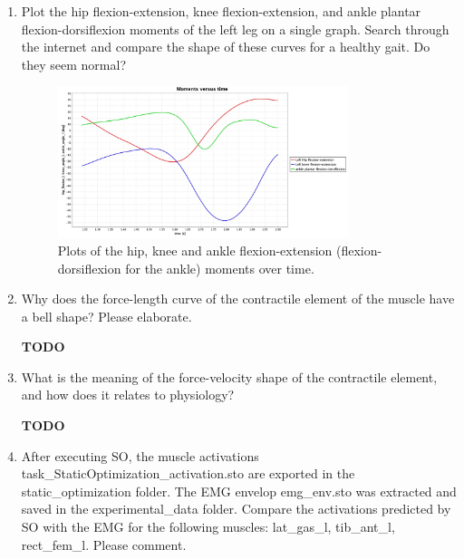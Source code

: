 \documentclass[11pt]{article}
\begin{document}
\begin{enumerate}
\begin{adjustwidth}{0.5cm}{}
    \end{adjustwidth}
    \item Plot the hip flexion-extension, knee flexion-extension, and ankle plantar flexion-dorsiflexion moments of the left leg on a single graph. Search through the internet and compare the shape of these curves for a healthy gait. Do they seem normal?
    \begin{adjustwidth}{0.5cm}{}
        \begin{figure}[h!]
            \centering
            \includegraphics[width=0.8\textwidth]{screens/moments_over_time.jpg}
            \caption{Plots of the hip, knee and ankle flexion-extension (flexion-dorsiflexion for the ankle) moments over time.}
        \end{figure}
    \end{adjustwidth}
    \item Why does the force-length curve of the contractile element of the muscle have a bell shape? Please elaborate. 
    \begin{adjustwidth}{0.5cm}{}
        \textbf{TODO}
    \end{adjustwidth}
    \item What is the meaning of the force-velocity shape of the contractile element, and how does it relates to physiology? 
    \begin{adjustwidth}{0.5cm}{}
        \textbf{TODO}
    \end{adjustwidth}
    \item After executing SO, the muscle activations task\_StaticOptimization\_activation.sto are exported in the static\_optimization folder. The EMG envelop emg\_env.sto was extracted and saved in the experimental\_data folder. Compare the activations predicted by SO with the EMG for the following muscles: lat\_gas\_l, tib\_ant\_l, rect\_fem\_l. Please comment.
    \begin{adjustwidth}{0.5cm}{}
        \begin{figure}[h!]
            \centering

\end{figure}
\end{adjustwidth}
\end{enumerate}
\end{document}
